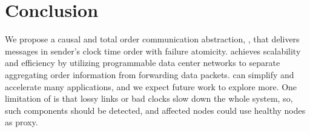 \section{Conclusion}
\label{sec:conclusion}

We propose a causal and total order communication abstraction, \sys{}, that delivers messages in sender's clock time order with failure atomicity. 
\sys{} achieves scalability and efficiency by utilizing programmable data center networks to separate aggregating order information from forwarding data packets.
\sys{} can simplify and accelerate many applications, and we expect future work to explore more. %
One limitation of \sys{} is that lossy links or bad clocks slow down the whole system, so, such components should be detected, and affected nodes could use healthy nodes as proxy.
